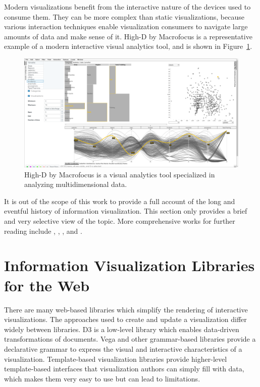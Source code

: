Modern visualizations benefit from the interactive nature of the
devices used to consume them. They can be more complex than static
visualizations, because various interaction techniques enable
visualization consumers to navigate large amounts of data and make
sense of it. High-D by Macrofocus \parencite{HighD} is a
representative example of a modern interactive visual analytics tool,
and is shown in Figure~\ref{fig:HighD}.

\begin{figure}[tp]
\centering
\includegraphics[keepaspectratio,width=\linewidth,height=\thirdh]
{images/high-d.png}
\caption[High-D]{
High-D by Macrofocus is a visual analytics tool
specialized in analyzing multidimensional data.
}
\label{fig:HighD}
\end{figure}




It is out of the scope of this work to provide a full account of the
long and eventful history of information visualization. This section
only provides a brief and very selective view of the topic. More
comprehensive works for further reading include
\textcite{BriefHistoryOfDataVis}, \textcite{Meirelles-2013},
\textcite{HistoryOfInformationGraphics}, and
\textcite{HistoryOfDataVisAndGraphicCommunication}.










\section{Information Visualization Libraries for the Web}

There are many web-based libraries which simplify the rendering of
interactive visualizations. The approaches used to create and update a
visualization differ widely between libraries. D3 is a low-level
library which enables data-driven transformations of documents. Vega
and other grammar-based libraries provide a declarative grammar to
express the visual and interactive characteristics of a visualization.
Template-based visualization libraries provide higher-level
template-based interfaces that visualization authors can simply fill
with data, which makes them very easy to use but can lead to
limitations.



